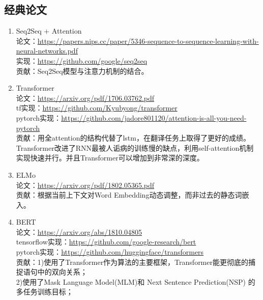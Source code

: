 \documentclass[lang=cn,11pt,a4paper]{elegant_template}
\begin{document}
\subsection{经典论文}
\begin{enumerate}
    \item Seq2Seq + Attention\\
    论文：\href{https://papers.nips.cc/paper/5346-sequence-to-sequence-learning-with-neural-networks.pdf}{https://papers.nips.cc/paper/5346-sequence-to-sequence-learning-with-neural-networks.pdf}  \\
    实现：\href{https://github.com/google/seq2seq}{https://github.com/google/seq2seq}  \\
    贡献：Seq2Seq模型与注意力机制的结合。 
    \item Transformer\\
    论文：\href{https://arxiv.org/pdf/1706.03762.pdf}{https://arxiv.org/pdf/1706.03762.pdf}  \\
    tf实现：\href{https://github.com/Kyubyong/transformer}{https://github.com/Kyubyong/transformer} \\
    pytorch实现：\href{https://github.com/jadore801120/attention-is-all-you-need-pytorch}{https://github.com/jadore801120/attention-is-all-you-need-pytorch}  \\
    贡献：用全attention的结构代替了lstm，在翻译任务上取得了更好的成绩。Transformer改进了RNN最被人诟病的训练慢的缺点，利用self-attention机制实现快速并行。并且Transformer可以增加到非常深的深度。
    \item ELMo\\
    论文：\href{https://arxiv.org/pdf/1802.05365.pdf}{https://arxiv.org/pdf/1802.05365.pdf}  \\
    贡献：根据当前上下文对Word Embedding动态调整，而非过去的静态词嵌入。
    \item BERT \\
    论文：\href{https://arxiv.org/abs/1810.04805}{https://arxiv.org/abs/1810.04805}  \\
    tensorflow实现：\href{https://github.com/google-research/bert}{https://github.com/google-research/bert} \\
    pytorch实现：\href{https://github.com/huggingface/transformers}{https://github.com/huggingface/transformers}  \\
    贡献：1)使用了Transformer作为算法的主要框架，Transformer能更彻底的捕捉语句中的双向关系；\\
    2)使用了Mask Language Model(MLM)和 Next Sentence Prediction(NSP) 的多任务训练目标；\\

\end{enumerate}
\end{document}
